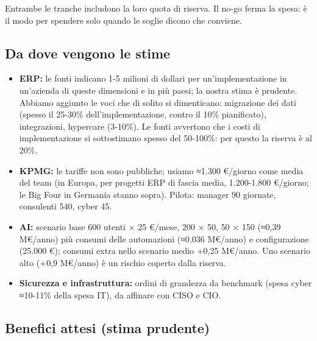 \documentclass[11pt,a4paper]{article}
\begin{document}
Entrambe le tranche includono la loro quota di riserva. Il no-go ferma la spesa: è il modo per spendere solo quando le soglie dicono che conviene.

\subsection{Da dove vengono le stime}\label{sec:15.3}
\begin{itemize}
\item \textbf{ERP:} le fonti indicano 1-5 milioni di dollari per un'implementazione in un'azienda di queste dimensioni e in più paesi; la nostra stima è prudente. Abbiamo aggiunto le voci che di solito si dimenticano: migrazione dei dati (spesso il 25-30\% dell'implementazione, contro il 10\% pianificato), integrazioni, hypercare (3-10\%). Le fonti avvertono che i costi di implementazione si sottostimano spesso del 50-100\%: per questo la riserva è al 20\%.
\item \textbf{KPMG:} le tariffe non sono pubbliche; usiamo ≈1.300 €/giorno come media del team (in Europa, per progetti ERP di fascia media, 1.200-1.800 €/giorno; le Big Four in Germania stanno sopra). Pilota: manager 90 giornate, consulenti 540, cyber 45.
\item \textbf{AI:} scenario base 600 utenti × 25 €/mese, 200 × 50, 50 × 150 (≈0,39 M€/anno) più consumi delle automazioni (≈0,036 M€/anno) e configurazione (25.000 €); consumi extra nello scenario medio +0,25 M€/anno. Uno scenario alto (+0,9 M€/anno) è un rischio coperto dalla riserva.
\item \textbf{Sicurezza e infrastruttura:} ordini di grandezza da benchmark (spesa cyber ≈10-11\% della spesa IT), da affinare con CISO e CIO.
\end{itemize}

\subsection{Benefici attesi (stima prudente)}\label{sec:15.4}
\end{document}
